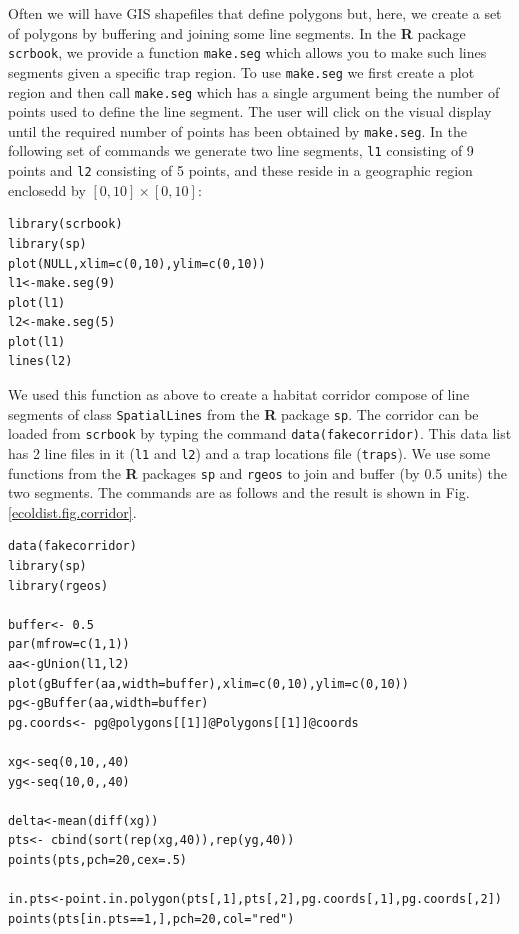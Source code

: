 Often we will have GIS shapefiles that define polygons but, here, we
 create a set of polygons by
buffering and joining some line segments.
In the {\bf R} package \mbox{\tt scrbook}, we provide
 a function \mbox{\tt make.seg} which allows you to make such
 lines segments given a
specific trap region.  To use %
\mbox{\tt make.seg} we first
create a plot region and then call \mbox{\tt make.seg} which has a
single argument being the number of points used to define the line
segment. The user will click on the visual display until the required
number of points has been obtained by \mbox{\tt make.seg}.
In the following set of commands we generate two line
segments, \mbox{\tt l1} consisting of 9 points and \mbox{\tt l2}
consisting of 5 points, and these reside in a geographic region
enclosedd by $[0,10] \times [0,10]$:
{\small
\begin{verbatim}
library(scrbook)
library(sp)
plot(NULL,xlim=c(0,10),ylim=c(0,10))
l1<-make.seg(9)
plot(l1)
l2<-make.seg(5)
plot(l1)
lines(l2)
\end{verbatim}
}

We used this function as above to create a habitat corridor compose of
line segments of class
\mbox{\tt SpatialLines} from the {\bf R} package \mbox{\tt sp}. The
corridor can be loaded from \mbox{\tt scrbook} by typing the command
\mbox{\tt data(fakecorridor)}.
This data list has 2 line files in it (\mbox{\tt l1} and \mbox{\tt l2}) and a
trap locations file (\mbox{\tt traps}).
We use some functions from the {\bf R} packages \mbox{\tt sp} and
\mbox{\tt rgeos} to join and
buffer (by 0.5 units) the two segments. The commands are as follows
and the result is shown in Fig. \ref{ecoldist.fig.corridor}.

{\small
\begin{verbatim}
data(fakecorridor)
library(sp)
library(rgeos)

buffer<- 0.5
par(mfrow=c(1,1))
aa<-gUnion(l1,l2)
plot(gBuffer(aa,width=buffer),xlim=c(0,10),ylim=c(0,10))
pg<-gBuffer(aa,width=buffer)
pg.coords<- pg@polygons[[1]]@Polygons[[1]]@coords

xg<-seq(0,10,,40)
yg<-seq(10,0,,40)

delta<-mean(diff(xg))
pts<- cbind(sort(rep(xg,40)),rep(yg,40))
points(pts,pch=20,cex=.5)

in.pts<-point.in.polygon(pts[,1],pts[,2],pg.coords[,1],pg.coords[,2])
points(pts[in.pts==1,],pch=20,col="red")
\end{verbatim}
}

